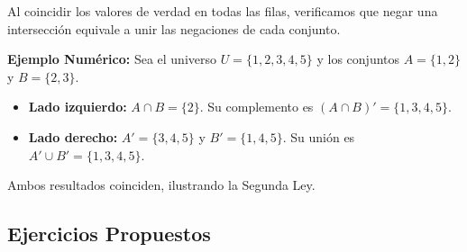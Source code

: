 Al coincidir los valores de verdad en todas las filas, verificamos que negar una intersección equivale a unir las negaciones de cada conjunto.

\vspace{0.3cm}
\noindent \textbf{Ejemplo Numérico:}
Sea el universo $U = \{1, 2, 3, 4, 5\}$ y los conjuntos $A = \{1, 2\}$ y $B = \{2, 3\}$.
\begin{itemize}
    \item \textbf{Lado izquierdo:} $A \cap B = \{2\}$. Su complemento es $(A \cap B)' = \{1, 3, 4, 5\}$.
    \item \textbf{Lado derecho:} $A' = \{3, 4, 5\}$ y $B' = \{1, 4, 5\}$. Su unión es $A' \cup B' = \{1, 3, 4, 5\}$.
\end{itemize}
Ambos resultados coinciden, ilustrando la Segunda Ley.

\subsection{Ejercicios Propuestos}

